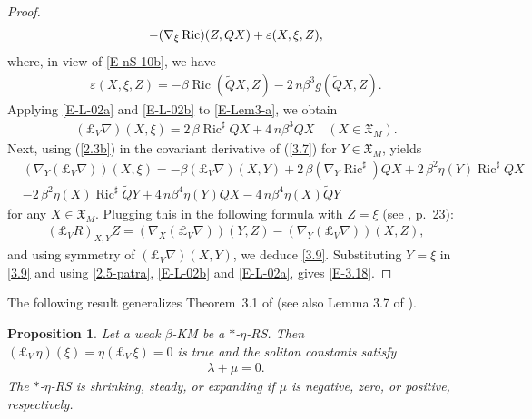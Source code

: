 \documentclass[11pt,a4paper,twoside]{article}
\newtheorem{proposition}{Proposition}%
\def\Ric{\operatorname{Ric}}
\begin{document}
{\begin{proof}
\begin{align}
 -(\nabla_{\xi}\,{\rm Ric})(Z,QX) + \varepsilon(X,\xi,Z) ,
\end{align}
where, in view of \eqref{E-nS-10b}, we have
\begin{align*}
 \varepsilon(X,\xi,Z) = - \beta\Ric(\widetilde Q X, Z) - 2\,n\beta^3 g(\widetilde Q X, Z).
\end{align*}
Applying \eqref{E-L-02a} and \eqref{E-L-02b} to \eqref{E-Lem3-a}, we obtain
\begin{align}\label{3.7}
 (\pounds_{V} \nabla)(X,\xi) = 2\,\beta\Ric^\sharp Q X + 4\,n\beta^3 Q X
 \quad (X\in\mathfrak{X}_M).
\end{align}
Next, using (\ref{2.3b}) in the covariant derivative of (\ref{3.7}) for $Y\in\mathfrak{X}_M$, yields
\begin{align*}
 &(\nabla_Y(\pounds_V\nabla))(X,\xi) =
 - \beta(\pounds_V\nabla)(X,Y)
 + 2\,\beta(\nabla_Y\Ric^\sharp)Q X
 + 2\,\beta^2\eta(Y)\Ric^\sharp QX \\
 & -2\,\beta^2\eta(X)\Ric^\sharp\widetilde Q Y
 + 4\,n\beta^4\eta(Y)QX
 -4\,n\beta^4\eta(X)\widetilde Q Y
\end{align*}
for any $X\in\mathfrak{X}_M$.
Plugging this in the following formula with $Z=\xi$ (see \cite{yano1970integral}, p.~23):
\begin{align*}%
 (\pounds_{V} R)_{X,Y} Z = (\nabla_{X}(\pounds_{V}\nabla))(Y,Z) -(\nabla_{Y}(\pounds_{V}\nabla))(X,Z),
\end{align*}
and using symmetry of $(\pounds_V\nabla)(X,Y)$, we deduce \eqref{3.9}.
Substituting $Y=\xi$ in \eqref{3.9} and using
\eqref{2.5-patra}, \eqref{E-L-02b} and \eqref{E-L-02a}, gives \eqref{E-3.18}.
\end{proof}

The following result generalizes Theorem~3.1 of \cite{ven-2019}  (see also Lemma 3.7 of \cite{ven-2022}).

\begin{proposition}\label{T-lambda0}
Let a weak $\beta$-KM be a $\ast$-$\eta$-RS.
Then $(\pounds_V\,\eta)(\xi) = \eta(\pounds_V\,\xi) = 0$ is true
and the soliton constants satisfy
\begin{align}\label{E-3.21b}
 \lambda +\mu = 0.
\end{align}
The $\ast$-$\eta$-RS is shrinking, steady, or expanding
if $\mu$ is negative, zero, or positive, respectively.
\end{proposition}

}
\end{document}
